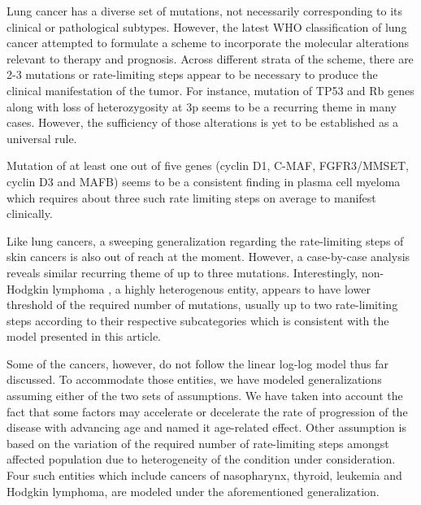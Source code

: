 \documentclass[lineno,sn-basic, Numbered]{sn-jnl}%
\theoremstyle{thmstyleone}%
\theoremstyle{thmstyletwo}%
\theoremstyle{thmstylethree}%
\begin{document}
\par
Lung cancer has a diverse set of mutations, not necessarily corresponding to its clinical or pathological subtypes. However, the latest WHO classification of lung cancer attempted to formulate a scheme to incorporate the molecular alterations relevant to therapy and prognosis. Across different strata of the scheme, there are 2-3 mutations or rate-limiting steps appear to be necessary to produce the clinical manifestation of the tumor. For instance, mutation of TP53 and Rb genes along with loss of heterozygosity at 3p seems to be a recurring theme in many cases. However, the sufficiency of those alterations is yet to be established as a universal rule.

Mutation of at least one out of five genes (cyclin D1, C-MAF, FGFR3/MMSET, cyclin D3 and MAFB) seems to be a consistent finding in plasma cell myeloma which requires about three such rate limiting steps on average to manifest clinically.

Like lung cancers, a sweeping generalization regarding the rate-limiting steps of skin cancers is also out of reach at the moment. However, a case-by-case analysis reveals similar recurring theme of up to three mutations. Interestingly, non-Hodgkin lymphoma , a highly heterogenous entity, appears to have lower threshold of the required number of mutations, usually up to two rate-limiting steps according to their respective subcategories which is consistent with the model presented in this article.

Some of the cancers, however, do not follow the linear log-log model thus far discussed. To accommodate those entities, we have modeled generalizations assuming either of the two sets of assumptions. We have taken into account the fact that some factors may accelerate or decelerate the rate of progression of the disease with advancing age and named it age-related effect. Other assumption is based on the variation of the required number of rate-limiting steps amongst affected population due to heterogeneity of the condition under consideration. Four such entities which include cancers of nasopharynx, thyroid, leukemia and Hodgkin lymphoma, are modeled under the aforementioned generalization.
\end{document}
